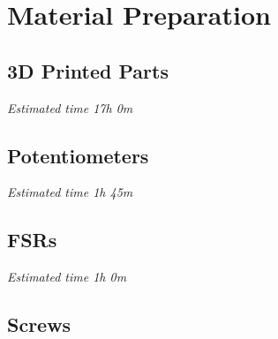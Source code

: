 
\chapter{Material Preparation}  %

\label {Material Preparation} 
%
%

\section{3D Printed Parts}
\textit{Estimated time 17h 0m}

\section{Potentiometers}
\textit{Estimated time 1h 45m}

\section{FSRs}
\textit{Estimated time 1h 0m}

\section{Screws}
